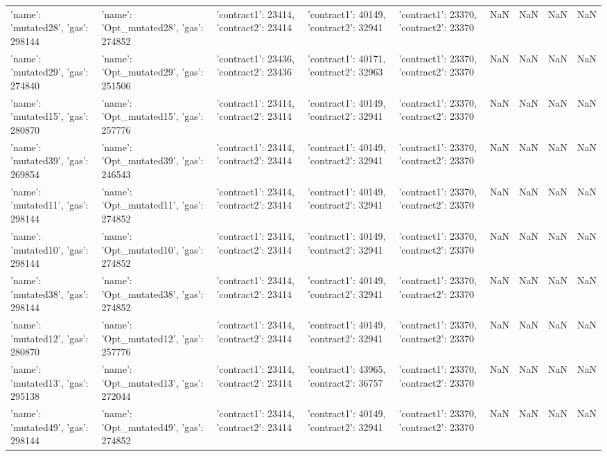 \begin{tabular}{lllllllll}
{'name': 'mutated28', 'gas': 298144} & {'name': 'Opt_mutated28', 'gas': 274852} & {'contract1': 23414, 'contract2': 23414} & {'contract1': 40149, 'contract2': 32941} & {'contract1': 23370, 'contract2': 23370} & NaN & NaN & NaN & NaN \\
{'name': 'mutated29', 'gas': 274840} & {'name': 'Opt_mutated29', 'gas': 251506} & {'contract1': 23436, 'contract2': 23436} & {'contract1': 40171, 'contract2': 32963} & {'contract1': 23370, 'contract2': 23370} & NaN & NaN & NaN & NaN \\
{'name': 'mutated15', 'gas': 280870} & {'name': 'Opt_mutated15', 'gas': 257776} & {'contract1': 23414, 'contract2': 23414} & {'contract1': 40149, 'contract2': 32941} & {'contract1': 23370, 'contract2': 23370} & NaN & NaN & NaN & NaN \\
{'name': 'mutated39', 'gas': 269854} & {'name': 'Opt_mutated39', 'gas': 246543} & {'contract1': 23414, 'contract2': 23414} & {'contract1': 40149, 'contract2': 32941} & {'contract1': 23370, 'contract2': 23370} & NaN & NaN & NaN & NaN \\
{'name': 'mutated11', 'gas': 298144} & {'name': 'Opt_mutated11', 'gas': 274852} & {'contract1': 23414, 'contract2': 23414} & {'contract1': 40149, 'contract2': 32941} & {'contract1': 23370, 'contract2': 23370} & NaN & NaN & NaN & NaN \\
{'name': 'mutated10', 'gas': 298144} & {'name': 'Opt_mutated10', 'gas': 274852} & {'contract1': 23414, 'contract2': 23414} & {'contract1': 40149, 'contract2': 32941} & {'contract1': 23370, 'contract2': 23370} & NaN & NaN & NaN & NaN \\
{'name': 'mutated38', 'gas': 298144} & {'name': 'Opt_mutated38', 'gas': 274852} & {'contract1': 23414, 'contract2': 23414} & {'contract1': 40149, 'contract2': 32941} & {'contract1': 23370, 'contract2': 23370} & NaN & NaN & NaN & NaN \\
{'name': 'mutated12', 'gas': 280870} & {'name': 'Opt_mutated12', 'gas': 257776} & {'contract1': 23414, 'contract2': 23414} & {'contract1': 40149, 'contract2': 32941} & {'contract1': 23370, 'contract2': 23370} & NaN & NaN & NaN & NaN \\
{'name': 'mutated13', 'gas': 295138} & {'name': 'Opt_mutated13', 'gas': 272044} & {'contract1': 23414, 'contract2': 23414} & {'contract1': 43965, 'contract2': 36757} & {'contract1': 23370, 'contract2': 23370} & NaN & NaN & NaN & NaN \\
{'name': 'mutated49', 'gas': 298144} & {'name': 'Opt_mutated49', 'gas': 274852} & {'contract1': 23414, 'contract2': 23414} & {'contract1': 40149, 'contract2': 32941} & {'contract1': 23370, 'contract2': 23370} & NaN & NaN & NaN & NaN \\

\end{tabular}
